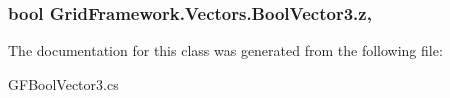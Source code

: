 \hypertarget{class_grid_framework_1_1_vectors_1_1_bool_vector3_adab045b6c2bfbd95c9d899a245a958ea_adab045b6c2bfbd95c9d899a245a958ea}{
\subsubsection[{z}]{\setlength{\rightskip}{0pt plus 5cm}bool Grid\+Framework.\+Vectors.\+Bool\+Vector3.\+z\hspace{0.3cm}{\ttfamily [get]}, {\ttfamily [set]}}}\label{class_grid_framework_1_1_vectors_1_1_bool_vector3_adab045b6c2bfbd95c9d899a245a958ea_adab045b6c2bfbd95c9d899a245a958ea}


The documentation for this class was generated from the following file\+:\begin{DoxyCompactItemize}
\item 
G\+F\+Bool\+Vector3.\+cs\end{DoxyCompactItemize}
